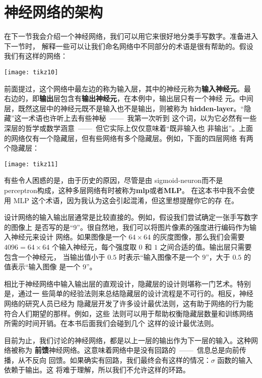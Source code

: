 \section{神经网络的架构}

在下一节我会介绍一个神经网络，我们可以用它来很好地分类手写数字。准备进入下一节时，
解释一些可以让我们命名网络中不同部分的术语是很有帮助的。假设我们有这样的网络：
\begin{center}
  \texttt{[image: tikz10]}
\end{center}

前面提过，这个网络中最左边的称为输入层，其中的神经元称为\textbf{输入神经元}。最
右边的，即\textbf{输出}层包含有\textbf{输出神经元}，在本例中，输出层只有一个神经
元。中间层，既然这层中的神经元既不是输入也不是输出，则被称为%
\textbf{\gls{hidden-layer}}。“隐藏”这一术语也许听上去有些神秘~——~我第一次听到
这个词，以为它必然有一些深层的哲学或数学涵意~——~但它实际上仅仅意味着“既非输入也
非输出”。上面的网络仅有一个隐藏层，但有些网络有多个隐藏层。例如，下面的四层网络
有两个隐藏层：
\begin{center}
  \texttt{[image: tikz11]}
\end{center}

有些令人困惑的是，由于历史的原因，尽管是由 \gls*{sigmoid-neuron}而不是%
\gls*{perceptron}构成，这种多层网络有时被称为\textbf{\gls{mlp}}或者\textbf{MLP}。
在这本书中我不会使用 MLP 这个术语，因为我认为这会引起混淆，但这里想提醒你它的存
在。

设计网络的输入输出层通常是比较直接的。例如，假设我们尝试确定一张手写数字的图像上
是否写的是“9”。很自然地，我们可以将图片像素的强度进行编码作为输入神经元来设计
网络。如果图像是一个 $64 \times 64$ 的灰度图像，那么我们会需要 $4096 = 64 \times
64$ 个输入神经元，每个强度取 $0$ 和 $1$ 之间合适的值。输出层只需要包含一个神经元，
当输出值小于 $0.5$ 时表示“输入图像不是一个 $9$”，大于 $0.5$ 的值表示“输入图像
是一个 $9$”。

相比于神经网络中输入输出层的直观设计，隐藏层的设计则堪称一门艺术。特别是，通过一
些简单的经验法则来总结隐藏层的设计流程是不可行的。相反，神经网络的研究人员已经为
隐藏层开发了许多设计最优法则，这有助于网络的行为能符合人们期望的那样。例如，这些
法则可以用于帮助权衡隐藏层数量和训练网络所需的时间开销。在本书后面我们会碰到几个
这样的设计最优法则。

目前为止，我们讨论的神经网络，都是以上一层的输出作为下一层的输入。这种网络被称为%
\textbf{前馈}神经网络。这意味着网络中是没有回路的~——~信息总是向前传播，从不反向
回馈。如果确实有回路，我们最终会有这样的情况：$\sigma$ 函数的输入依赖于输出。这
将难于理解，所以我们不允许这样的环路。

